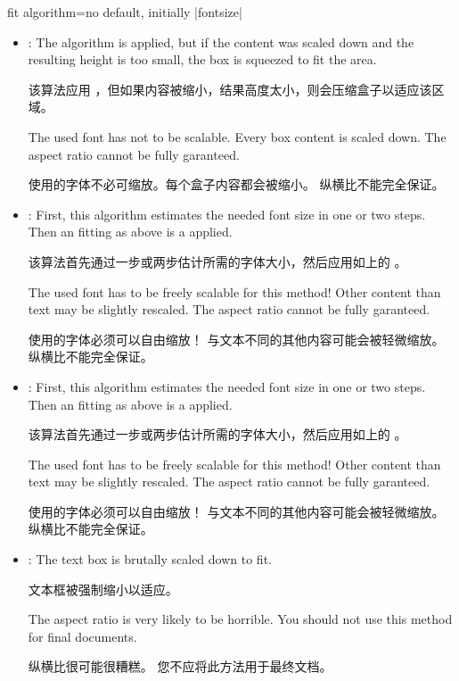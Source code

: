 \begin{docTcbKey}{fit algorithm}{=}{no default, initially |fontsize|}
\begin{itemize}
\begin{marker}
使用的字体不必可缩放。每个盒子内容都会被缩小。
纵横比不能完全保证。
    \end{marker}
  \item{}:
    The  algorithm is applied, but if the content was scaled
    down and the resulting height is too small, the box is squeezed to fit the area.

    该算法应用 ，但如果内容被缩小，结果高度太小，则会压缩盒子以适应该区域。
    \begin{marker}
    The used font has not to be scalable. Every box content is scaled down.
    The aspect ratio cannot be fully garanteed.

使用的字体不必可缩放。每个盒子内容都会被缩小。
纵横比不能完全保证。
    \end{marker}
  \item{}:
    First, this algorithm estimates the needed font size in one or two steps.
    Then an  fitting as above is a applied.

    该算法首先通过一步或两步估计所需的字体大小，然后应用如上的  。
    \begin{marker}
    The used font has to be freely scalable for this method!
    Other content than text may be slightly rescaled.
    The aspect ratio cannot be fully garanteed.

使用的字体必须可以自由缩放！
与文本不同的其他内容可能会被轻微缩放。
纵横比不能完全保证。
    \end{marker}
  \item{}:
    First, this algorithm estimates the needed font size in one or two steps.
    Then an  fitting as above is a applied.

    该算法首先通过一步或两步估计所需的字体大小，然后应用如上的  。
    \begin{marker}
The used font has to be freely scalable for this method!
Other content than text may be slightly rescaled.
The aspect ratio cannot be fully garanteed.

使用的字体必须可以自由缩放！
与文本不同的其他内容可能会被轻微缩放。
纵横比不能完全保证。
    \end{marker}
  \item{}:
The text box is brutally scaled down to fit.

文本框被强制缩小以适应。
    \begin{marker}
    The aspect ratio is very likely to be horrible.
    You should not use this method for final documents.

纵横比很可能很糟糕。
您不应将此方法用于最终文档。
    \end{marker}
\end{itemize}


\end{docTcbKey}

